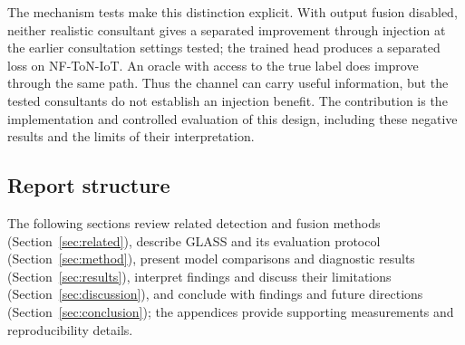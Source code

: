 The mechanism tests make this distinction explicit. With output fusion disabled, neither realistic consultant gives a separated improvement through injection at the earlier consultation settings tested; the trained head produces a separated loss on NF-ToN-IoT. An oracle with access to the true label does improve through the same path. Thus the channel can carry useful information, but the tested consultants do not establish an injection benefit. The contribution is the implementation and controlled evaluation of this design, including these negative results and the limits of their interpretation.

\subsection{Report structure}

The following sections review related detection and fusion methods (Section~\ref{sec:related}), describe GLASS and its evaluation protocol (Section~\ref{sec:method}), present model comparisons and diagnostic results (Section~\ref{sec:results}), interpret findings and discuss their limitations (Section~\ref{sec:discussion}), and conclude with findings and future directions (Section~\ref{sec:conclusion}); the appendices provide supporting measurements and reproducibility details.

